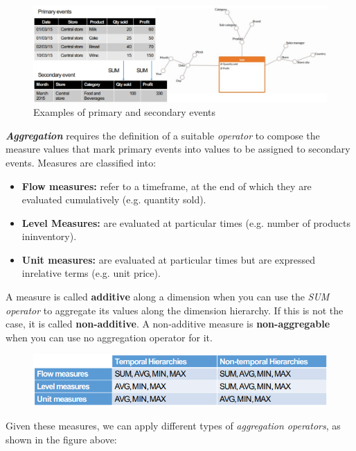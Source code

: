 \begin{figure}[ht!]
    \centering
    \includegraphics[scale=0.65]{images/DFM_prim_sec_events.png}
    \caption{Examples of primary and secondary events}
    \label{figPrimSecEvents}
\end{figure}

\textit{\textbf{Aggregation}} requires the definition of a suitable \textit{operator} to compose the measure values that mark primary events into values to be assigned to secondary events. Measures are classified into:
\begin{itemize}
    \item \textbf{Flow measures:} refer to a timeframe, at the end of which they are evaluated cumulatively (e.g. quantity sold).
    \item \textbf{Level Measures:} are evaluated at particular times (e.g. number of products ininventory).
    \item \textbf{Unit measures:} are evaluated at particular times but are expressed inrelative terms (e.g. unit price).
\end{itemize}
A measure is called \textbf{additive} along a dimension when you can use the \textit{SUM operator} to aggregate its values along the dimension hierarchy. If this is not the case, it is called \textbf{non-additive}. A non-additive measure is \textbf{non-aggregable} when you can use no aggregation operator for it.
\newpage
\begin{figure}[ht!]
    \centering
    \includegraphics[scale=0.92]{images/DFM_measures.png}
\end{figure}
Given these measures, we can apply different types of \textit{aggregation operators}, as shown in the figure above:

